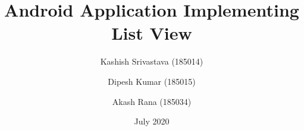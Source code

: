 \documentclass[11pt,a4paper]{report}
\begin{document}
    
\renewcommand\bibname{References}

\titleformat{\chapter}{\bfseries\huge\centering}{}{0pt}{}{\huge}
\titlespacing*{\chapter}{0pt}{-60pt}{40pt}
\setlength{\parindent}{2em}
\setlength{\parskip}{1em}

\newenvironment{myindentpar}[1]%
  {\begin{list}{}%
          {\setlength{\leftmargin}{#1}}%
          \item[]%
  }
  {\end{list}}

\title{Android Application Implementing List View}

\author{Kashish Srivastava (185014)\\
        \and 
        Dipesh Kumar (185015)\\
        \and
        Akash Rana (185034)
}

\date{July 2020}



\pagestyle{plain}
\end{document}
